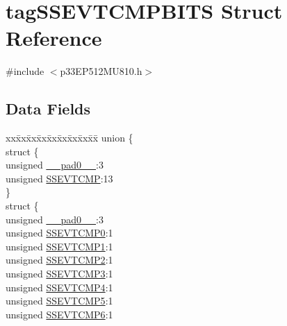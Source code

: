 \hypertarget{structtag_s_s_e_v_t_c_m_p_b_i_t_s}{}\section{tag\+S\+S\+E\+V\+T\+C\+M\+P\+B\+I\+TS Struct Reference}
\label{structtag_s_s_e_v_t_c_m_p_b_i_t_s}


{\ttfamily \#include $<$p33\+E\+P512\+M\+U810.\+h$>$}

\subsection*{Data Fields}
\begin{DoxyCompactItemize}
\item 
\begin{tabbing}
xx\=xx\=xx\=xx\=xx\=xx\=xx\=xx\=xx\=\kill
union \{\\
\>struct \{\\
\>\>unsigned \hyperlink{structtag_s_s_e_v_t_c_m_p_b_i_t_s_adf71f3d8410c1f1dbbc96680a92c49af}{\_\_pad0\_\_}:3\\
\>\>unsigned \hyperlink{structtag_s_s_e_v_t_c_m_p_b_i_t_s_a18c01b29bbc6dbdb927a5d8724e1ed38}{SSEVTCMP}:13\\
\>\} \\
\>struct \{\\
\>\>unsigned \hyperlink{structtag_s_s_e_v_t_c_m_p_b_i_t_s_adf71f3d8410c1f1dbbc96680a92c49af}{\_\_pad0\_\_}:3\\
\>\>unsigned \hyperlink{structtag_s_s_e_v_t_c_m_p_b_i_t_s_a988af440c2c7b8bac11ed32294d04c19}{SSEVTCMP0}:1\\
\>\>unsigned \hyperlink{structtag_s_s_e_v_t_c_m_p_b_i_t_s_a90c24b159b5b78c22d2f93877cc09fa9}{SSEVTCMP1}:1\\
\>\>unsigned \hyperlink{structtag_s_s_e_v_t_c_m_p_b_i_t_s_ab4e50241410a5ffef4a9608f56776f17}{SSEVTCMP2}:1\\
\>\>unsigned \hyperlink{structtag_s_s_e_v_t_c_m_p_b_i_t_s_ab86abcd8264b477551c1f5956b9b55d8}{SSEVTCMP3}:1\\
\>\>unsigned \hyperlink{structtag_s_s_e_v_t_c_m_p_b_i_t_s_a8952e48746169845c59782c7bd0e4821}{SSEVTCMP4}:1\\
\>\>unsigned \hyperlink{structtag_s_s_e_v_t_c_m_p_b_i_t_s_a841a137062e7911bfd6a6d00b6597c4a}{SSEVTCMP5}:1\\
\>\>unsigned \hyperlink{structtag_s_s_e_v_t_c_m_p_b_i_t_s_aa95e6204e68fda3163ce0f5cd4394a7a}{SSEVTCMP6}:1\\

\end{tabbing}
\end{DoxyCompactItemize}
